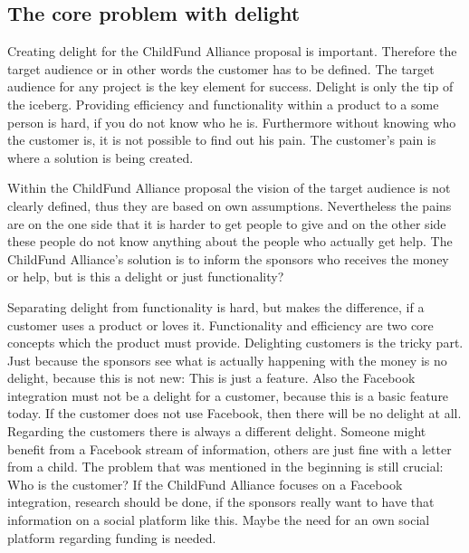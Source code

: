 
\subsection{The core problem with delight}
Creating delight for the ChildFund Alliance proposal is important.  Therefore the target audience or in other words the customer has to be defined. The target audience for any project is the key element for success. Delight is only the tip of the iceberg. Providing efficiency and functionality within a product to a some person is hard, if you do not know who he is. Furthermore without knowing who the customer is, it is not possible to find out his pain. The customer's pain is where a solution is being created. 

Within the ChildFund Alliance proposal the vision of the target audience is not clearly defined, thus they are based on own assumptions. Nevertheless the pains are on the one side that it is harder to get people to give and on the other side these people do not know anything about the people who actually get help. The ChildFund Alliance's solution is to inform the sponsors who receives the money or help, but is this a delight or just functionality?

Separating delight from functionality is hard, but makes the difference, if a customer uses a product or loves it. Functionality and efficiency are two core concepts which the product must provide. Delighting customers is the tricky part. Just because the sponsors see what is actually happening with the money is no delight, because this is not new: This is just a feature. Also the Facebook integration must not be a delight for a customer, because this is a basic feature today. If the customer does not use Facebook, then there will be no delight at all. Regarding the customers there is always a different delight. Someone might benefit from a Facebook stream of information, others are just fine with a letter from a child. The problem that was mentioned in the beginning is still crucial: Who is the customer? If the ChildFund Alliance focuses on a Facebook integration, research should be done, if the sponsors really want to have that information on a social platform like this. Maybe the need for an own social platform regarding funding is needed.
	
